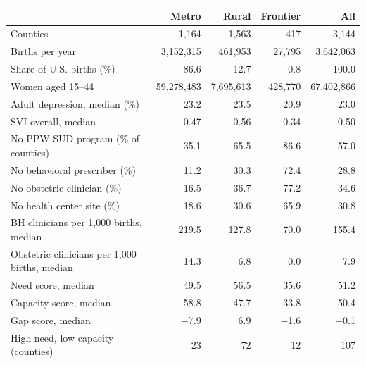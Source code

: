 \begin{tabular}{@{}lrrrr@{}}
\toprule
 & Metro & Rural & Frontier & All \\
\midrule
Counties & 1{,}164 & 1{,}563 & 417 & 3{,}144 \\
Births per year & 3{,}152{,}315 & 461{,}953 & 27{,}795 & 3{,}642{,}063 \\
Share of U.S. births (\%) & 86.6 & 12.7 & 0.8 & 100.0 \\
Women aged 15--44 & 59{,}278{,}483 & 7{,}695{,}613 & 428{,}770 & 67{,}402{,}866 \\
Adult depression, median (\%) & 23.2 & 23.5 & 20.9 & 23.0 \\
SVI overall, median & 0.47 & 0.56 & 0.34 & 0.50 \\
No PPW SUD program (\% of counties) & 35.1 & 65.5 & 86.6 & 57.0 \\
No behavioral prescriber (\%) & 11.2 & 30.3 & 72.4 & 28.8 \\
No obstetric clinician (\%) & 16.5 & 36.7 & 77.2 & 34.6 \\
No health center site (\%) & 18.6 & 30.6 & 65.9 & 30.8 \\
BH clinicians per 1,000 births, median & 219.5 & 127.8 & 70.0 & 155.4 \\
Obstetric clinicians per 1,000 births, median & 14.3 & 6.8 & 0.0 & 7.9 \\
Need score, median & 49.5 & 56.5 & 35.6 & 51.2 \\
Capacity score, median & 58.8 & 47.7 & 33.8 & 50.4 \\
Gap score, median & $-$7.9 & 6.9 & $-$1.6 & $-$0.1 \\
High need, low capacity (counties) & 23 & 72 & 12 & 107 \\
\bottomrule
\end{tabular}